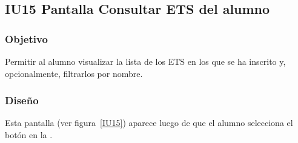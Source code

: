 \subsection{IU15 Pantalla Consultar ETS del alumno}

\label{IU15}
\newpage

\subsubsection{Objetivo}
Permitir al alumno visualizar la lista de los ETS en los que se ha inscrito y, opcionalmente, filtrarlos por nombre.

\subsubsection{Diseño}
Esta pantalla  (ver figura~\ref{IU15}) aparece luego de que el alumno selecciona el botón  en la .

